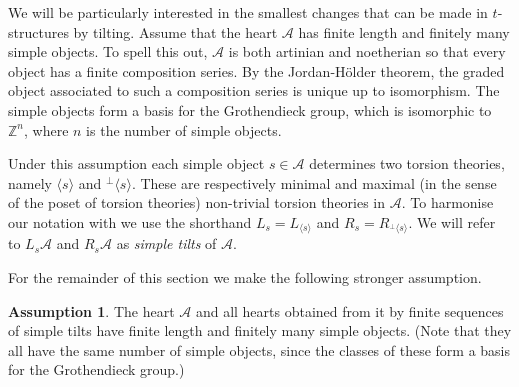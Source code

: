\documentclass{article}
\theoremstyle{plain}
\theoremstyle{definition}
\newtheorem{assumption}{Assumption}
\theoremstyle{remark}
\newcommand{\Z}{\mathbb{Z}}
\newcommand{\cat}[1]{\mathcal{#1}}
\begin{document}
We will be particularly interested in the smallest changes that can be made in $t$-structures by tilting. 
Assume that the heart $\cat{A}$ has finite length and finitely many simple objects. To spell this out, $\cat{A}$ is both artinian and noetherian so that every object has a finite composition series. By the Jordan-H\"older theorem, the graded object associated to such a composition series is unique up to isomorphism. The simple objects form a basis for the Grothendieck group, which is isomorphic to $\Z^n$, where $n$ is the number of simple objects. 

Under this assumption each simple object $s\in \cat{A}$ determines two torsion theories, namely $\langle s \rangle$ and ${}^\perp\langle s \rangle$. These are respectively minimal and maximal (in the sense of the poset of torsion theories) non-trivial torsion theories in $\cat{A}$. To harmonise our notation with \cite{Bridgeland:fk} we use the shorthand $L_s = L_{\langle s \rangle}$ and $R_s = R_{{}^\perp\langle s \rangle}$. We will refer to $L_s\cat{A}$ and $R_s\cat{A}$ as {\em simple tilts} of $\cat{A}$.

For the remainder of this section we make the following stronger assumption.
\begin{assumption}
\label{assumption1}
The heart $\cat{A}$ and all hearts obtained from it by finite sequences of simple tilts have finite length and finitely many simple objects. (Note that they all have the same number of simple objects, since the classes of these form a basis for the Grothendieck group.)
\end{assumption}
\end{document}
